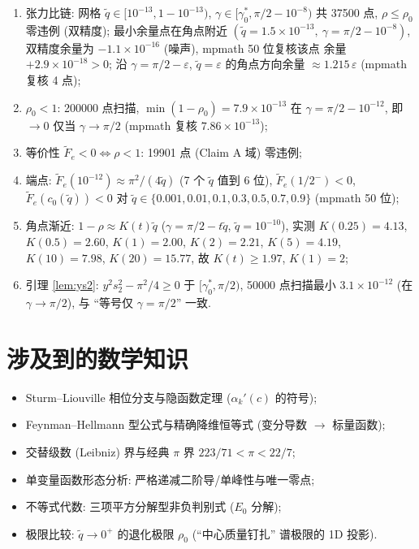 \documentclass[UTF8]{ctexart}
\begin{document}
\begin{enumerate}
	\item 张力比链: 网格 $\tilde q\in[10^{-13},1-10^{-13})$,
		$\gamma\in[\gamma_0^*,\pi/2-10^{-8})$ 共 37500 点,
		$\rho\le\rho_0$ 零违例 (双精度); 最小余量点在角点附近
		$(\tilde q=1.5\times10^{-13},\ \gamma=\pi/2-10^{-8})$,
		双精度余量为 $-1.1\times10^{-16}$ (噪声), mpmath 50 位复核该点
		余量 $+2.9\times10^{-18}>0$; 沿 $\gamma=\pi/2-\varepsilon$,
		$\tilde q=\varepsilon$ 的角点方向余量 $\approx1.215\,\varepsilon$
		(mpmath 复核 4 点);
	\item $\rho_0<1$: 200000 点扫描, $\min(1-\rho_0)=7.9\times10^{-13}$
		在 $\gamma=\pi/2-10^{-12}$, 即 $\to0$ 仅当 $\gamma\to\pi/2$
		(mpmath 复核 $7.86\times10^{-13}$);
	\item 等价性 $\widetilde F_e<0\iff\rho<1$: 19901 点 (Claim A 域)
		零违例;
	\item 端点: $\widetilde F_e(10^{-12})\approx\pi^2/(4\tilde q)$
		(7 个 $\tilde q$ 值到 6 位), $\widetilde F_e(1/2^-)<0$,
		$\widetilde F_e(c_0(\tilde q))<0$ 对
		$\tilde q\in\{0.001,0.01,0.1,0.3,0.5,0.7,0.9\}$ (mpmath 50 位);
	\item 角点渐近: $1-\rho\approx K(t)\tilde q$
		($\gamma=\pi/2-t\tilde q$, $\tilde q=10^{-10}$), 实测
		$K(0.25)=4.13$, $K(0.5)=2.60$, $K(1)=2.00$, $K(2)=2.21$,
		$K(5)=4.19$, $K(10)=7.98$, $K(20)=15.77$, 故 $K(t)\ge1.97$,
		$K(1)=2$;
	\item 引理 \ref{lem:ys2}: $y^2s_2^2-\pi^2/4\ge0$ 于 $[\gamma_0^*,\pi/2)$,
		50000 点扫描最小 $3.1\times10^{-12}$ (在 $\gamma\to\pi/2$),
		与 ``等号仅 $\gamma=\pi/2$'' 一致.
\end{enumerate}

\section{涉及到的数学知识}

\begin{itemize}
	\item Sturm--Liouville 相位分支与隐函数定理 ($\alpha_k'(c)$ 的符号);
	\item Feynman--Hellmann 型公式与精确降维恒等式 (变分导数 $\to$ 标量函数);
	\item 交替级数 (Leibniz) 界与经典 $\pi$ 界 $223/71<\pi<22/7$;
	\item 单变量函数形态分析: 严格递减二阶导/单峰性与唯一零点;
	\item 不等式代数: 三项平方分解型非负判别式 ($E_0$ 分解);
	\item 极限比较: $\tilde q\to0^+$ 的退化极限 $\rho_0$ (``中心质量钉扎''
		谱极限的 1D 投影).
\end{itemize}
\end{document}
